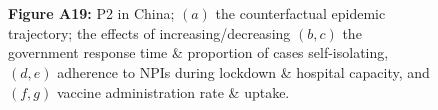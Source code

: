 \documentclass[paper=a4,fontsize=11pt]{article}
\begin{document}
\begin{figure}[!h]
  \\
  \hspace{1.76cm}
  \\
  \caption*{\textbf{Figure A19:} P2 in China; $(a)$ the counterfactual epidemic trajectory; the effects of increasing/decreasing $(b,c)$ the government response time \& proportion of cases self-isolating, $(d,e)$ adherence to NPIs during lockdown \& hospital capacity, and $(f,g)$ vaccine administration rate \& uptake.}
\end{figure}
\end{document}
